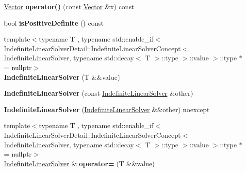 \begin{DoxyCompactItemize}
\item 
\hyperlink{classSpacy_1_1Vector}{Vector} {\bfseries operator()} (const \hyperlink{classSpacy_1_1Vector}{Vector} \&x) const \hypertarget{classSpacy_1_1IndefiniteLinearSolver_a150a854c97a44c1c53c4aa071e1b8b12}{}\label{classSpacy_1_1IndefiniteLinearSolver_a150a854c97a44c1c53c4aa071e1b8b12}

\item 
bool {\bfseries is\+Positive\+Definite} () const \hypertarget{classSpacy_1_1IndefiniteLinearSolver_a04191e6ed2c8cd54870c79a919dcae39}{}\label{classSpacy_1_1IndefiniteLinearSolver_a04191e6ed2c8cd54870c79a919dcae39}

\item 
{\footnotesize template$<$typename T , typename std\+::enable\+\_\+if$<$ Indefinite\+Linear\+Solver\+Detail\+::\+Indefinite\+Linear\+Solver\+Concept$<$ Indefinite\+Linear\+Solver, typename std\+::decay$<$ T $>$\+::type $>$\+::value $>$\+::type $\ast$  = nullptr$>$ }\\{\bfseries Indefinite\+Linear\+Solver} (T \&\&value)\hypertarget{classSpacy_1_1IndefiniteLinearSolver_af60b1bb12efcf0daccfb48122867ea96}{}\label{classSpacy_1_1IndefiniteLinearSolver_af60b1bb12efcf0daccfb48122867ea96}

\item 
{\bfseries Indefinite\+Linear\+Solver} (const \hyperlink{classSpacy_1_1IndefiniteLinearSolver}{Indefinite\+Linear\+Solver} \&other)\hypertarget{classSpacy_1_1IndefiniteLinearSolver_a85f4481ed4c6f349cede484c25ba259e}{}\label{classSpacy_1_1IndefiniteLinearSolver_a85f4481ed4c6f349cede484c25ba259e}

\item 
{\bfseries Indefinite\+Linear\+Solver} (\hyperlink{classSpacy_1_1IndefiniteLinearSolver}{Indefinite\+Linear\+Solver} \&\&other) noexcept\hypertarget{classSpacy_1_1IndefiniteLinearSolver_affb21cb06e47a51c0f228f11a84fc3fd}{}\label{classSpacy_1_1IndefiniteLinearSolver_affb21cb06e47a51c0f228f11a84fc3fd}

\item 
{\footnotesize template$<$typename T , typename std\+::enable\+\_\+if$<$ Indefinite\+Linear\+Solver\+Detail\+::\+Indefinite\+Linear\+Solver\+Concept$<$ Indefinite\+Linear\+Solver, typename std\+::decay$<$ T $>$\+::type $>$\+::value $>$\+::type $\ast$  = nullptr$>$ }\\\hyperlink{classSpacy_1_1IndefiniteLinearSolver}{Indefinite\+Linear\+Solver} \& {\bfseries operator=} (T \&\&value)\hypertarget{classSpacy_1_1IndefiniteLinearSolver_a6ed5d50bdf25e31ea81a3aaa0c35dd8e}{}\label{classSpacy_1_1IndefiniteLinearSolver_a6ed5d50bdf25e31ea81a3aaa0c35dd8e}


\end{DoxyCompactItemize}
